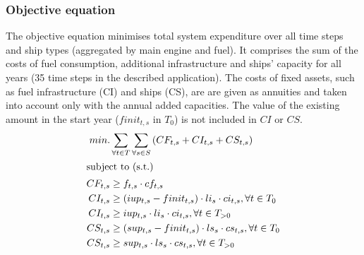 \documentclass[article]{elsarticle}
\begin{document}
\subsubsection{Objective equation}
The objective equation minimises total system expenditure over all time steps and ship types (aggregated by main engine and fuel). It comprises the sum of the costs of fuel consumption, additional infrastructure and ships' capacity for all years (35 time steps in the described application). The costs of fixed assets, such as fuel infrastructure (CI) and ships (CS), are are given as annuities and taken into account only with the annual added capacities. The value of the existing amount in the start year ($finit_{t,s}$ in $T_0$) is not included in $CI$ or $CS$.
\begin{subequations}
    \begin{align}
        min. &\sum_{\forall t \in T}\sum_{\forall s \in S}\left( CF_{t, s} + CI_{t, s} + CS_{t, s} \right)\\
        \intertext{subject to (s.t.)}
        CF_{t, s} &\geq f_{t,s} \cdot cf_{t,s}\\
        CI_{t, s} &\geq \left( iup_{t,s} - finit_{t, s} \right) \cdot li_{s} \cdot ci_{t,s}, \forall t \in T_0\\
        CI_{t, s} &\geq iup_{t,s} \cdot li_{s} \cdot ci_{t,s}, \forall t \in T_{>0}\\
        CS_{t, s} &\geq \left( sup_{t,s} - finit_{t, s} \right) \cdot ls_{s} \cdot cs_{t,s}, \forall t \in T_0\\
        CS_{t, s} &\geq sup_{t,s} \cdot ls_{s} \cdot cs_{t,s}, \forall t \in T_{>0}
    \end{align}
\end{subequations}
\end{document}
